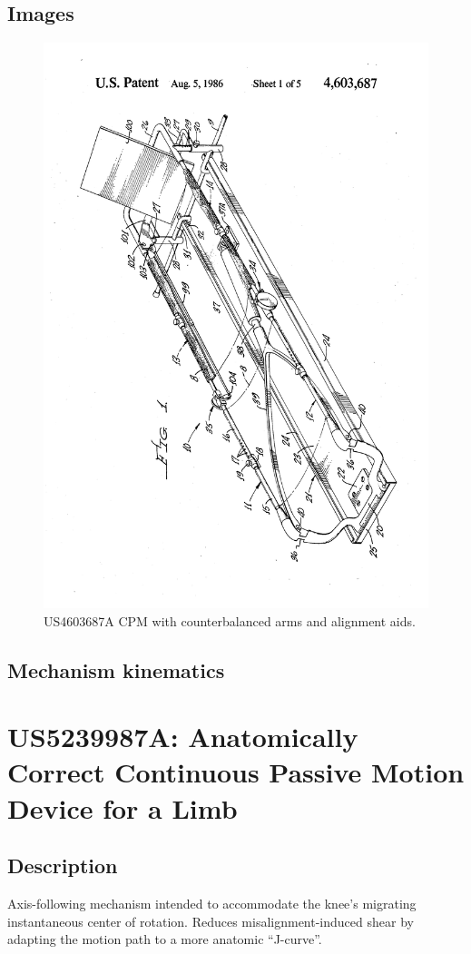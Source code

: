 \documentclass[11pt]{article}
\begin{document}
\subsection{Images}
\begin{figure}[H]
  \centering
  \includegraphics[width=0.54\linewidth, angle=-90]{US4603687_1.png}
  \caption{US4603687A CPM with counterbalanced arms and alignment aids.}
  \label{fig:US4603687A}
\end{figure}

\subsection{Mechanism kinematics}

\section{US5239987A: Anatomically Correct Continuous Passive Motion Device for a Limb}
\subsection{Description}
Axis-following mechanism intended to accommodate the knee’s migrating instantaneous center of rotation. Reduces misalignment-induced shear by adapting the motion path to a more anatomic \enquote{J-curve}.
\end{document}
